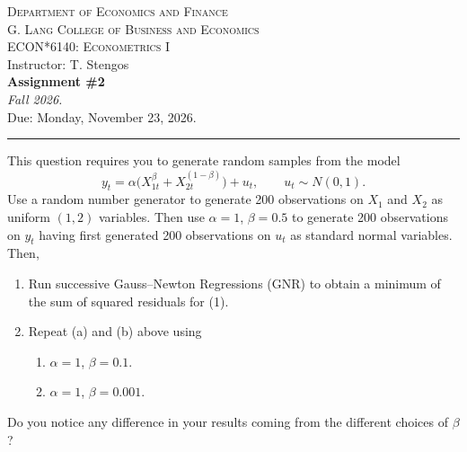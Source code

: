 \documentclass[11pt]{article}
\begin{document}
\begin{center}
  {\footnotesize\scshape Department of Economics and Finance\\
  G. Lang College of Business and Economics}\\[5pt]
  {\large\scshape ECON*6140: Econometrics I}\\[3pt]
  {\small Instructor: T. Stengos}\\[5pt]
  {\LARGE\bfseries Assignment \#2}\\[4pt]
  {\itshape Fall 2026.}\\[3pt]
  {\small Due: Monday, November 23, 2026.}
\end{center}
\vspace{0.4em}\hrule\vspace{0.9em}

This question requires you to generate random samples from the model
\begin{equation}\tag{1}
  y_t = \alpha\bigl(X_{1t}^{\beta} + X_{2t}^{(1-\beta)}\bigr) + u_t,
  \qquad u_t \sim N(0,1).
\end{equation}
Use a random number generator to generate 200 observations on $X_1$ and
$X_2$ as uniform $(1,2)$ variables. Then use $\alpha=1$, $\beta=0.5$ to
generate 200 observations on $y_t$ having first generated 200 observations
on $u_t$ as standard normal variables. Then,
\begin{enumerate}[label=(\roman*),leftmargin=2em,itemsep=4pt,topsep=3pt]
\item Run successive Gauss--Newton Regressions (GNR) to obtain a minimum
of the sum of squared residuals for (1).
\item Repeat (a) and (b) above using
\begin{enumerate}[label=(\alph*),leftmargin=2em,itemsep=2pt,topsep=3pt]
\item $\alpha=1$, $\beta=0.1$.
\item $\alpha=1$, $\beta=0.001$.
\end{enumerate}
\end{enumerate}
Do you notice any difference in your results coming from the different
choices of $\beta$?
\end{document}

